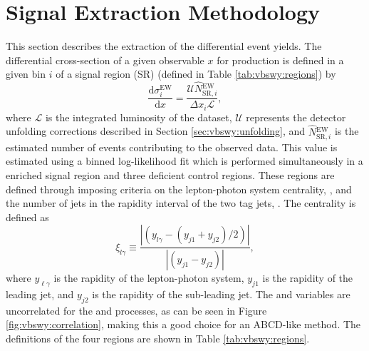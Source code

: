 \section{Signal Extraction Methodology}\label{sec:vbswy:sigextraction}
This section describes the extraction of the \ewwy differential event yields. The differential cross-section of a given observable $x$ for \ewwy production is defined in a given bin $i$ of a signal region (SR) (defined in Table \ref{tab:vbswy:regions}) by
\begin{equation}
  \frac{\mathrm{d}\sigma_i^{\text{EW}}}{\mathrm{d}x}=\frac{\mathcal{U}\hat{N}{}^{\text{EW}}_{\text{SR},i}}{\Delta x_i\mathcal{L}},
\end{equation}
where $\mathcal{L}$ is the integrated luminosity of the dataset, $\mathcal{U}$ represents the detector unfolding corrections described in Section \ref{sec:vbswy:unfolding}, and $\hat{N}{}^{\text{EW}}_{\text{SR},i}$ is the estimated number of \ewwy events contributing to the observed data. This value is estimated using a binned log-likelihood fit which is performed simultaneously in a \ewwy enriched signal region and three \ewwy deficient control regions. These regions are defined through imposing criteria on the lepton-photon system centrality, \xily, and the number of jets in the rapidity interval of the two tag jets, \Ngapjets. The centrality is defined as
\begin{equation} 
  \xi_{l\gamma}\equiv\frac{|(y_{l\gamma}-(y_{j1}+y_{j2})/2)|}{|(y_{j1}-y_{j2})|},
\end{equation}
where $y_{\ell\gamma}$ is the rapidity of the lepton-photon system, $y_{j1}$ is the rapidity of the leading jet, and $y_{j2}$ is the rapidity of the sub-leading jet. The \ngapjet and \xily variables are uncorrelated for the \qcdwy and \ewwy processes, as can be seen in Figure \ref{fig:vbswy:correlation}, making this a good choice for an ABCD-like method. The definitions of the four regions are shown in Table \ref{tab:vbswy:regions}.%
%
%
